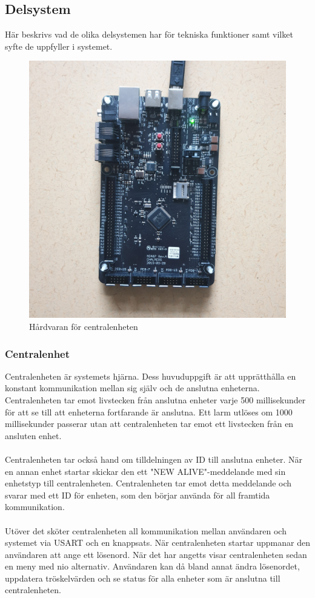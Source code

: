 \documentclass{article}
\begin{document}
\subsection{Delsystem}
Här beskrivs vad de olika delsystemen har för tekniska funktioner samt vilket syfte de uppfyller i systemet.

\begin{figure}[h]
    \centering
    \includegraphics[scale=0.05]{Projektrapport/central.png}
    \caption {Hårdvaran för centralenheten}
    \label{fig:drawing}
\end{figure}

\subsubsection{Centralenhet}
Centralenheten är systemets hjärna. 
Dess huvuduppgift är att upprätthålla en konstant kommunikation mellan sig själv och de anslutna enheterna. 
Centralenheten tar emot livstecken från anslutna enheter varje 500 millisekunder för att se till att enheterna fortfarande är anslutna. 
Ett larm utlöses om 1000 millisekunder passerar utan att centralenheten tar emot ett livstecken från en ansluten enhet.\\
\\
Centralenheten tar också hand om tilldelningen av ID till anslutna enheter. 
När en annan enhet startar skickar den ett "NEW ALIVE"-meddelande med sin enhetstyp till centralenheten. 
Centralenheten tar emot detta meddelande och svarar med ett ID för enheten, som den börjar använda för all framtida kommunikation.\\
\\
Utöver det sköter centralenheten all kommunikation mellan användaren och systemet via USART och en knappsats. 
När centralenheten startar uppmanar den användaren att ange ett lösenord. 
När det har angetts visar centralenheten sedan en meny med nio alternativ. 
Användaren kan då bland annat ändra lösenordet, uppdatera tröskelvärden och se status för alla enheter som är anslutna till centralenheten.
\end{document}
